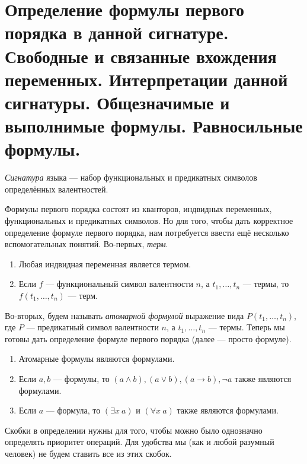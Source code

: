 \documentclass{article}
\begin{document}
\section{Определение формулы первого порядка в данной сигнатуре. Свободные и связанные вхождения переменных. Интерпретации данной сигнатуры. Общезначимые и выполнимые формулы. Равносильные формулы.}
\begin{definition} \textit{Сигнатура} языка --- набор функциональных и предикатных символов определённых валентностей. \end{definition}
Формулы первого порядка состоят из кванторов, индвидных переменных, функциональных и предикатных символов. Но для того, чтобы дать корректное определение формуле первого порядка, нам потребуется ввести ещё несколько вспомогательных понятий. Во-первых, \textit{терм}.
\begin{enumerate}
	\item Любая индвидная переменная является термом.
	\item Если $f$ --- функциональный символ валентности $n$, а $t_1, \ldots, t_n$ --- термы, то $f(t_1, \ldots, t_n)$ --- терм.
\end{enumerate}
 Во-вторых, будем называть \textit{атомарной формулой} выражение вида $P(t_1, \ldots, t_n)$, где $P$ --- предикатный символ валентности $n$, а $t_1, \ldots, t_n$ --- термы. Теперь мы готовы дать определение формуле первого порядка (далее --- просто формуле).
\begin{definition}
	\begin{enumerate}
		\item Атомарные формулы являются формулами.
		\item Если $a, b$ --- формулы, то $(a \land b), (a \lor b), (a \to b), \lnot a$ также являются формулами.
		\item Если $a$ --- формула, то $(\exists x \  a)$ и $(\forall x \  a)$ также являются формулами.
	\end{enumerate}
\end{definition}
Скобки в определении нужны для того, чтобы можно было однозначно определять приоритет операций. Для удобства мы (как и любой разумный человек) не будем ставить все из этих скобок.
\end{document}
